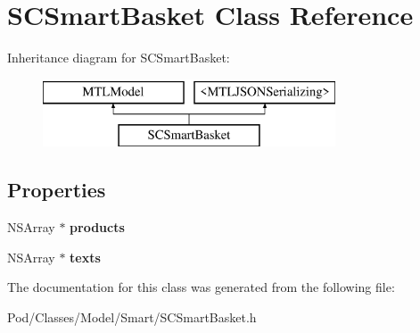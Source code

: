 \hypertarget{interface_s_c_smart_basket}{}\section{S\+C\+Smart\+Basket Class Reference}
\label{interface_s_c_smart_basket}
Inheritance diagram for S\+C\+Smart\+Basket\+:\begin{figure}[H]
\begin{center}
\leavevmode
\includegraphics[height=2.000000cm]{interface_s_c_smart_basket}
\end{center}
\end{figure}
\subsection*{Properties}
\begin{DoxyCompactItemize}
\item 
N\+S\+Array $\ast$ {\bfseries products}\hypertarget{interface_s_c_smart_basket_ac2a3231988d5f1b75a1eedddb18babd5}{}\label{interface_s_c_smart_basket_ac2a3231988d5f1b75a1eedddb18babd5}

\item 
N\+S\+Array $\ast$ {\bfseries texts}\hypertarget{interface_s_c_smart_basket_a1631d4ffde4e0e386cb1331e86a06112}{}\label{interface_s_c_smart_basket_a1631d4ffde4e0e386cb1331e86a06112}

\end{DoxyCompactItemize}


The documentation for this class was generated from the following file\+:\begin{DoxyCompactItemize}
\item 
Pod/\+Classes/\+Model/\+Smart/S\+C\+Smart\+Basket.\+h\end{DoxyCompactItemize}
